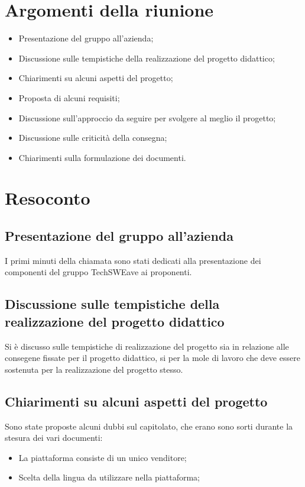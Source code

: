 \documentclass[a4paper]{article}
\begin{document}
\section{Argomenti della riunione}
\begin{itemize}
    \item Presentazione del gruppo all'azienda;
    \item Discussione sulle tempistiche della realizzazione del progetto didattico;
    \item Chiarimenti su alcuni aspetti del progetto;
    \item Proposta di alcuni requisiti;
    \item Discussione sull'approccio da seguire per svolgere al meglio il progetto;
    \item Discussione sulle criticità della consegna;
    \item Chiarimenti sulla formulazione dei documenti.
\end{itemize}
\section{Resoconto}
\subsection{Presentazione del gruppo all'azienda}
I primi minuti della chiamata sono stati dedicati alla presentazione dei componenti del gruppo TechSWEave ai proponenti.
\subsection{Discussione sulle tempistiche della realizzazione del progetto didattico}
Si è discusso sulle tempistiche di realizzazione del progetto sia in relazione alle consegene fissate per il progetto didattico, si per la mole di lavoro che deve essere sostenuta per la realizzazione del progetto stesso.
\subsection{Chiarimenti su alcuni aspetti del progetto}
Sono state proposte alcuni dubbi sul capitolato, che erano sono sorti durante la stesura dei vari documenti:
\begin{itemize}
    \item La piattaforma consiste di un unico venditore;
    \item Scelta della lingua da utilizzare nella piattaforma;
\end{itemize}
\end{document}
